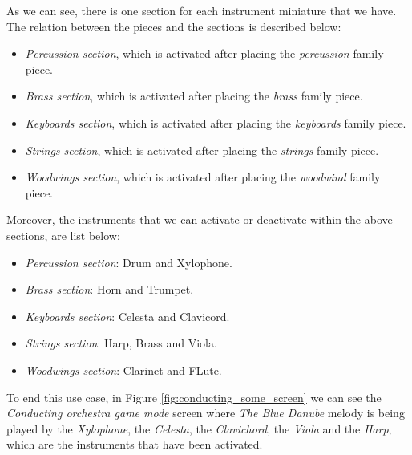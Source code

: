 As we can see, there is one section for each instrument miniature that we have. The relation between the pieces and the sections is described below:
\begin{itemize}
\item \textit{Percussion section}, which is activated after placing the \textit{percussion} family piece.
\item \textit{Brass section}, which is activated after placing the \textit{brass} family piece.
\item \textit{Keyboards section}, which is activated after placing the \textit{keyboards} family piece.
\item \textit{Strings section}, which is activated after placing the \textit{strings} family piece.
\item \textit{Woodwings section}, which is activated after placing the \textit{woodwind} family piece.
\end{itemize}

\newpage

Moreover, the instruments that we can activate or deactivate within the above sections, are list below:
\begin{itemize}
\item \textit{Percussion section}: Drum and Xylophone.
\item \textit{Brass section}: Horn and Trumpet.
\item \textit{Keyboards section}: Celesta and Clavicord.
\item \textit{Strings section}: Harp, Brass and Viola.
\item \textit{Woodwings section}: Clarinet and FLute.
\end{itemize}

To end this use case, in Figure \ref{fig:conducting_some_screen} we can see the \textit{Conducting orchestra game mode} screen where \textit{The Blue Danube} melody is being played by the \textit{Xylophone}, the \textit{Celesta}, the \textit{Clavichord}, the \textit{Viola} and the \textit{Harp}, which are the instruments that have been activated.

